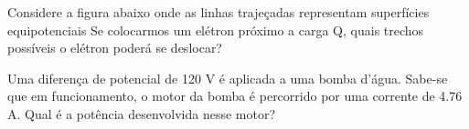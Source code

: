 \documentclass[12pt, addpoints]{exam}
\begin{document}
\begin{questions}
\begin{multicols*}{2}
\begin{oneparchoices}
\end{oneparchoices}
\question[20] Considere a figura abaixo onde as linhas trajeçadas representam superfícies equipotenciais Se colocarmos um elétron próximo a carga Q, quais trechos possíveis o elétron poderá se deslocar?
        
        \begin{center}
            \begin{minipage}[c]{0.5\linewidth}
            \end{minipage}
        \end{center}
        
        

\begin{oneparchoices}
\end{oneparchoices}
\question[20] Uma diferença de potencial de 120 V é aplicada a uma bomba d’água. Sabe-se que em funcionamento, o motor da bomba é percorrido por uma corrente de    4.76 A. Qual é a potência desenvolvida nesse motor?


\end{multicols*}
\end{questions}
\end{document}
